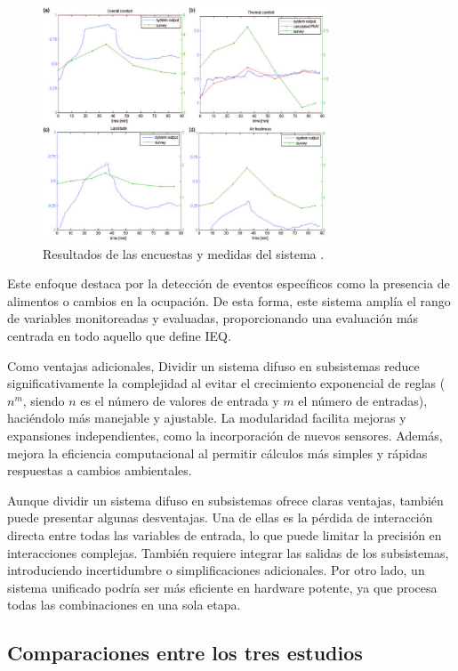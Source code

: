 \begin{figure}[H]
	\centering
	\includegraphics[width=0.76\textwidth]{imgs/fuzzy-inference-system-results.JPG}
	\caption{Resultados de las encuestas y medidas del sistema \parencite{jablonski2018fuzzy}.}
	\label{fig:fuzzy-inference-system-results}
\end{figure}

Este enfoque destaca por la detección de eventos específicos como la presencia de alimentos o cambios en la ocupación. De esta forma, este sistema amplía el rango de variables monitoreadas y evaluadas, proporcionando una evaluación más centrada en todo aquello que define IEQ.

Como ventajas adicionales, Dividir un sistema difuso en subsistemas reduce significativamente la complejidad al evitar el crecimiento exponencial de reglas ($n^m$, siendo $n$ es el número de valores de entrada y $m$ el número de entradas), haciéndolo más manejable y ajustable. La modularidad facilita mejoras y expansiones independientes, como la incorporación de nuevos sensores. Además, mejora la eficiencia computacional al permitir cálculos más simples y rápidas respuestas a cambios ambientales.

Aunque dividir un sistema difuso en subsistemas ofrece claras ventajas, también puede presentar algunas desventajas. Una de ellas es la pérdida de interacción directa entre todas las variables de entrada, lo que puede limitar la precisión en interacciones complejas. También requiere integrar las salidas de los subsistemas, introduciendo incertidumbre o simplificaciones adicionales. Por otro lado, un sistema unificado podría ser más eficiente en hardware potente, ya que procesa todas las combinaciones en una sola etapa.

\subsection{Comparaciones entre los tres estudios}

